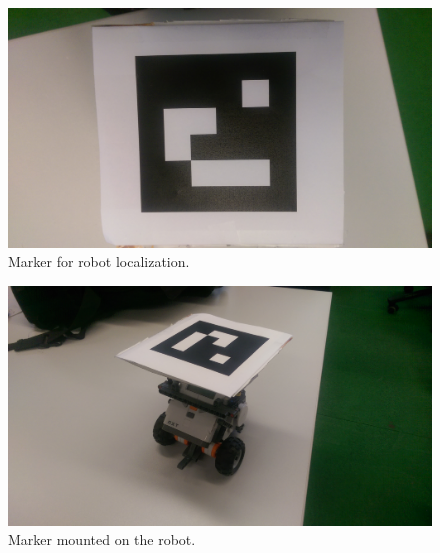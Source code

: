 \documentclass[paper=a4, fontsize=11pt]{scrartcl} %
\begin{document}
    \begin{figure}[h!]
        \begin{center}
            \setlength{\fboxsep}{0.5pt} %
            \setlength{\fboxrule}{0.5pt}
            \includegraphics[width=12cm,fbox]{images/marker.jpg}
            \caption{Marker for robot localization.}
        \end{center}
    \end{figure}

    \begin{figure}[h!]
        \begin{center}
            \setlength{\fboxsep}{0.5pt} %
            \setlength{\fboxrule}{0.5pt}
            \includegraphics[width=12cm,fbox]{images/marker_robot.jpg}
            \caption{Marker mounted on the robot.}
        \end{center}
    \end{figure}

\newpage
\end{document}
